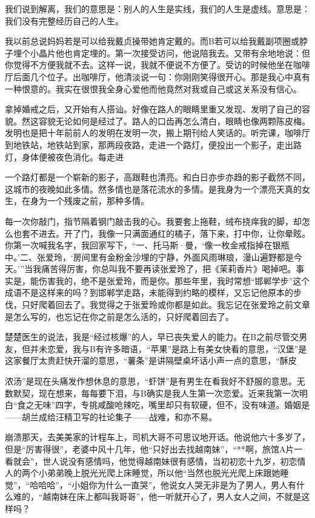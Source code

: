 \documentclass{article}
\begin{document}
我们说到解离，我们的意思是：别人的人生是实线，我们的人生是虚线。意思是：我们没有完整经历自己的人生。

我以前总说妈妈若是可以给我戴贞操带她肯定戴的。而B若可以给我戴副项圈或脖子埋个小晶片他也肯定埋的。第一次接受访问，他说陪我去。又带有余地地说：但你觉得不方便我就不去。这样一说，我就不便说不方便了。受访的时候他坐在咖啡厅后面几个位子。出咖啡厅，他清淡说一句：你刚刚笑得很开心。那是我心中真有一种恨意的。我实在很恨我全身心爱他而他竟然对我或自己或这关系没有信心。

拿掉婚戒之后，又开始有人搭讪。好像在路人的眼睛里重又发现、发明了自己的容貌。然这容貌无论如何是经过了。路人的口齿再怎么清白，眼睛也像两颗陈皮梅。发明也是把十年前前人的发明在发明一次，搬上期刊给人笑话的。听完课，咖啡厅到地铁站，地铁站到家，那两段夜路，走进一个路灯，便投出一个影子，走出路灯，身体便被夜色消化。每走进

\newpage 

一个路灯都是一个崭新的影子，高跟鞋也清亮。和白日亦步亦趋的影子截然不同，这城市的夜晚如此多情。然多情也是落花流水的多情。是我身为一个漂亮天真的女生，在身为一个残废之前，那种多情。

每一次你敲门，指节隔着钢门敲击我的心。我要套上拖鞋，绒布挠痒我的脚，却怎么也套不进去。开了门，我像一只满面通红的橘子，落下来，打中你，让你晕眩。你第一次喊我名字，我回家写下，“一、托马斯·曼，‘像一枚金戒指掉在银瓶中。’二、张爱玲，‘房间里有金粉金沙埋的宁静，外面风雨琳琅，漫山遍野都是今天。’”当我痛苦得厉害，你总叫我不要再读张爱玲了，把《茉莉香片》喝掉吧。事实是，能伤害我的，绝不是张爱玲，而是你。那些年里，我时常想“邯郸学步”这个成语不是这样来的吗？到邯郸学走路，未能得到约略的模样，又忘记他原本的步伐，只好爬着回去了。我觉得之于张爱玲或你都是如此。我忘记在张爱玲之前文章是怎么写的，也忘记在你之前是怎么活的，只好爬着回去了。

楚楚医生的说法，我是“经过核爆”的人，早已丧失爱人的能力。在B之前尽管交男友，但并未恋爱，我与B有许多暗语，“苹果”是路上有美女快看的意思，“汉堡”是这家餐厅太贵赶快开溜的意思，“薯条”是讲隔壁桌坏话小声一点的意思，“酥皮

\newpage 

浓汤”是现在头痛发作想休息的意思，“虾饼”是有男生在看我好不舒服的意思。无数默契，现在想来，每每要下泪，与B确实是我人生第一次恋爱。近来我第一次明白“食之无味”四字，专挑咸酸呛辣吃，嘴里却只有软硬，但不，没有味道。婚姻是——胡兰成给汪精卫写的社论集子——战难，和亦不易。

崩溃那天，去美美家的计程车上，司机大哥不可思议地开话。他说他六十多岁了，但是“厉害得很”，老婆中风十几年，他“只好出去找越南妹”，“**啊，旅馆A片一看就会”，世人说没有感情吗，他觉得越南妹很有感情，当初初恋十九岁，初恋情人的两个小弟弟晚上脱光光爬上床睡觉，所以他“当然也脱光光爬上床跟她睡觉”，“哈哈哈”，“小姐你为什么一直哭”，他说女人哭无非是为了男人，男人有什么难的，“越南妹在床上都叫我哥哥”，他一听就开心了，男人女人之间，不就是这样吗？
\end{document}
